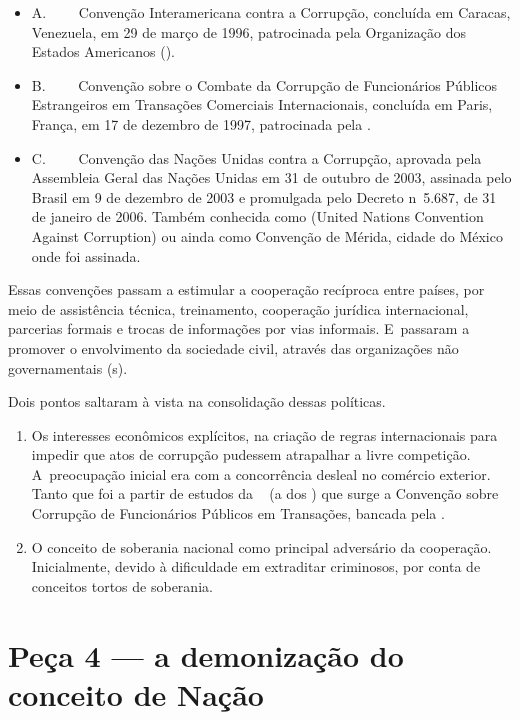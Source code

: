 \begin{itemize}
\itemsep1pt\parskip0pt
\item
  A.~~~~ Convenção Interamericana contra a Corrupção, concluída em
  Caracas, Venezuela, em 29 de março de 1996, patrocinada pela
  Organização dos Estados Americanos ().
\item
  B.~~~~ Convenção sobre o Combate da Corrupção de Funcionários Públicos
  Estrangeiros em Transações Comerciais Internacionais, concluída em
  Paris, França, em 17 de dezembro de 1997, patrocinada pela .
\item
  C.~~~~ Convenção das Nações Unidas contra a Corrupção, aprovada pela
  Assembleia Geral das Nações Unidas em 31 de outubro de 2003, assinada
  pelo Brasil em 9 de dezembro de 2003 e promulgada pelo Decreto n\,  5.687, de 31 de janeiro de 2006. Também conhecida como  (United
  Nations Convention Against Corruption) ou ainda como Convenção de
  Mérida, cidade do México onde foi assinada.
\end{itemize}

Essas convenções passam a estimular a cooperação recíproca entre países,
por meio de assistência técnica, treinamento, cooperação jurídica
internacional, parcerias formais e trocas de informações por vias
informais. E~passaram a promover o envolvimento da sociedade civil,
através das organizações não governamentais (s).

Dois pontos saltaram à vista na consolidação dessas políticas.

\begin{enumerate}
\itemsep1pt\parskip0pt
\item
  Os interesses econômicos explícitos, na criação de regras
  internacionais para impedir que atos de corrupção pudessem atrapalhar
  a livre competição. A~preocupação inicial era com a concorrência
  desleal no comércio exterior. Tanto que foi a partir de estudos da
  ~ (a  dos ) que surge a Convenção sobre Corrupção de
  Funcionários Públicos em Transações, bancada pela .
\item
  O conceito de soberania nacional como principal adversário da
  cooperação. Inicialmente, devido à dificuldade em extraditar
  criminosos, por conta de conceitos tortos de soberania.
\end{enumerate}

\section{Peça 4 --- a demonização do conceito de Nação~}

